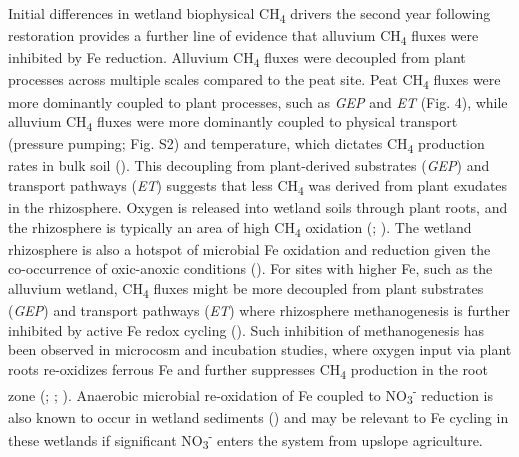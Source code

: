 \documentclass[
  12pt,
]{article}
\begin{document}
Initial differences in wetland biophysical CH\textsubscript{4} drivers
the second year following restoration provides a further line of
evidence that alluvium CH\textsubscript{4} fluxes were inhibited by Fe
reduction. Alluvium CH\textsubscript{4} fluxes were decoupled from plant
processes across multiple scales compared to the peat site. Peat
CH\textsubscript{4} fluxes were more dominantly coupled to plant
processes, such as \emph{GEP} and \emph{ET} (Fig. 4), while alluvium
CH\textsubscript{4} fluxes were more dominantly coupled to physical
transport (pressure pumping; Fig. S2) and temperature, which dictates
CH\textsubscript{4} production rates in bulk soil
(). This decoupling from plant-derived substrates (\emph{GEP}) and
transport pathways (\emph{ET}) suggests that less CH\textsubscript{4}
was derived from plant exudates in the rhizosphere. Oxygen is released
into wetland soils through plant roots, and the rhizosphere is typically
an area of high CH\textsubscript{4} oxidation
(;
). The wetland
rhizosphere is also a hotspot of microbial Fe oxidation and reduction
given the co-occurrence of oxic-anoxic conditions
(). For
sites with higher Fe, such as the alluvium wetland, CH\textsubscript{4}
fluxes might be more decoupled from plant substrates (\emph{GEP}) and
transport pathways (\emph{ET}) where rhizosphere methanogenesis is
further inhibited by active Fe redox cycling
(). Such
inhibition of methanogenesis has been observed in microcosm and
incubation studies, where oxygen input via plant roots re-oxidizes
ferrous Fe and further suppresses CH\textsubscript{4} production in the
root zone (;
;
). Anaerobic microbial re-oxidation of Fe coupled to
NO\textsubscript{3}\textsuperscript{-} reduction is also known to occur
in wetland sediments () and may be relevant to Fe cycling in these wetlands if
significant NO\textsubscript{3}\textsuperscript{-} enters the system
from upslope agriculture.
\end{document}
